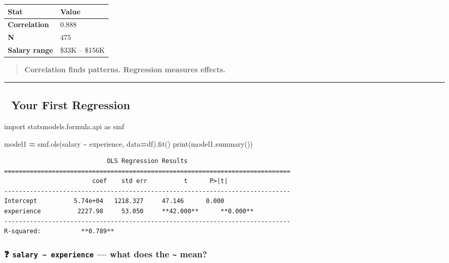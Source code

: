 \documentclass[
]{article}
\newenvironment{Shaded}{\begin{snugshade}}{\end{snugshade}}
\newcommand{\BuiltInTok}[1]{#1}
\newcommand{\ImportTok}[1]{#1}
\newcommand{\NormalTok}[1]{#1}
\newcommand{\OperatorTok}[1]{\textcolor[rgb]{0.81,0.36,0.00}{\textbf{#1}}}
\newcommand{\StringTok}[1]{\textcolor[rgb]{0.31,0.60,0.02}{#1}}
\begin{document}
\begin{longtable}[]{@{}ll@{}}
\toprule\noalign{}
Stat & Value \\
\midrule\noalign{}
\endhead
\bottomrule\noalign{}
\endlastfoot
\textbf{Correlation} & 0.888 \\
\textbf{N} & 475 \\
\textbf{Salary range} & \$33K -- \$156K \\
\end{longtable}

\begin{quote}
\textbf{Correlation finds patterns. Regression measures effects.}
\end{quote}

\begin{center}\rule{0.5\linewidth}{0.5pt}\end{center}

\subsection{🧮 Your First Regression}\label{your-first-regression}

\begin{Shaded}
\begin{Highlighting}[]
\ImportTok{import}\NormalTok{ statsmodels.formula.api }\ImportTok{as}\NormalTok{ smf}

\NormalTok{model1 }\OperatorTok{=}\NormalTok{ smf.ols(}\StringTok{\textquotesingle{}salary \textasciitilde{} experience\textquotesingle{}}\NormalTok{, data}\OperatorTok{=}\NormalTok{df).fit()}
\BuiltInTok{print}\NormalTok{(model1.summary())}
\end{Highlighting}
\end{Shaded}

\begin{verbatim}
                            OLS Regression Results
==============================================================================
                        coef    std err          t      P>|t|
------------------------------------------------------------------------------
Intercept          5.74e+04   1218.327     47.146      0.000
experience          2227.98     53.050     **42.000**      **0.000**
------------------------------------------------------------------------------
R-squared:           **0.789**
\end{verbatim}

\subsubsection{\texorpdfstring{❓
\texttt{salary\ \textasciitilde{}\ experience} --- what does the
\texttt{\textasciitilde{}}
mean?}{❓ salary \textasciitilde{} experience --- what does the \textasciitilde{} mean?}}\label{salary-experience-what-does-the-mean}
\end{document}
